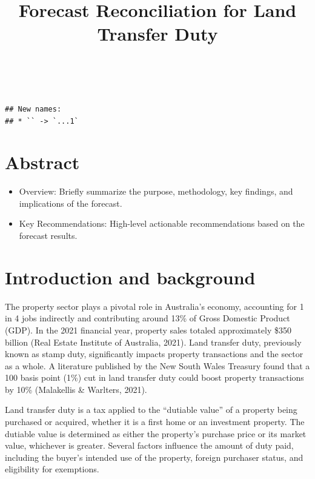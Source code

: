 \documentclass[11pt,a4paper,]{article}
\title{Forecast Reconciliation for Land Transfer Duty}
\author{\sf{\Large\textbf{Hoang Do}\\\large Monash University\\[0.5cm]}}
\date{\sf\Date~\Month~\Year}
\makeatletter
\providecommand{\tightlist}{%
  \setlength{\itemsep}{0pt}\setlength{\parskip}{0pt}}
\def\titlepage{\front{\expandafter{\@title}}{\@author}{\@organization}}
\makeatother
\begin{document}
\titlepage

{
\setcounter{tocdepth}{2}
\tableofcontents
}
\begin{verbatim}
## New names:
## * `` -> `...1`
\end{verbatim}

\section{Abstract}\label{abstract}

\begin{itemize}
\tightlist
\item
  Overview: Briefly summarize the purpose, methodology, key findings, and implications of the forecast.
\item
  Key Recommendations: High-level actionable recommendations based on the forecast results.
\end{itemize}

\section{Introduction and background}\label{introduction-and-background}

The property sector plays a pivotal role in Australia's economy, accounting for 1 in 4 jobs indirectly and contributing around 13\% of Gross Domestic Product (GDP). In the 2021 financial year, property sales totaled approximately \$350 billion (Real Estate Institute of Australia, 2021). Land transfer duty, previously known as stamp duty, significantly impacts property transactions and the sector as a whole. A literature published by the New South Wales Treasury found that a 100 basis point (1\%) cut in land transfer duty could boost property transactions by 10\% (Malakellis \& Warlters, 2021).

Land transfer duty is a tax applied to the ``dutiable value'' of a property being purchased or acquired, whether it is a first home or an investment property. The dutiable value is determined as either the property's purchase price or its market value, whichever is greater. Several factors influence the amount of duty paid, including the buyer's intended use of the property, foreign purchaser status, and eligibility for exemptions.
\end{document}
